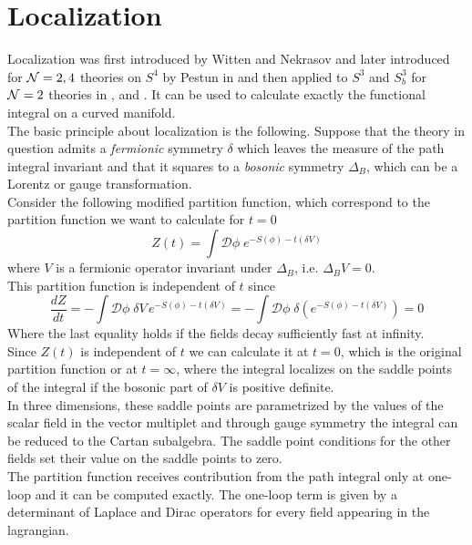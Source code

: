 \section{Localization}
Localization was first introduced by Witten \cite{Witten:1992xu} and Nekrasov \cite{Nekrasov:2002qd} and later introduced  for $\mathcal{N}=2,4$ theories on  $S^4$ by Pestun in \cite{Pestun:2007rz} and then applied to $S^3$ and $S_b^3$ for $\mathcal{N}=2$ theories in \cite{Kapustin:2009kz}, \cite{Hama:2010av} and \cite{Hama:2011ea}.
It can be used to calculate exactly the functional integral on a curved manifold.\\
The basic principle about localization is the following.
Suppose that the theory in question admits a \emph{fermionic} symmetry $\delta$ which leaves the measure of the path integral invariant and that it squares to a \emph{bosonic} symmetry $\Delta_B$, which can be a Lorentz or gauge transformation.\\
Consider the following modified partition function, which correspond to the partition function we want to calculate for $t=0$
\begin{equation}
Z(t) = \int \mathcal{D} \phi \; e^{- S(\phi) - t (\delta V)}
\end{equation}
where $V$ is a fermionic operator invariant under $\Delta_B$, i.e. $ \Delta_B V = 0$.\\
This partition function is independent of $t$ since
\begin{equation}
 \frac{d Z}{d t} = - \int \mathcal{D} \phi \; \delta V \, e^{- S(\phi) - t (\delta V)} =  - \int  \mathcal{D} \phi \; \delta \left( e^{- S(\phi) - t (\delta V)  }\right) = 0
\end{equation}
Where the last equality holds if the fields decay sufficiently fast at infinity.\\
Since $Z(t)$ is independent of $t$ we can calculate it at $t=0$, which is the original partition function or at $t=\infty$, where the integral localizes on the saddle points of the integral if the bosonic part of $\delta V$ is positive definite.\\
In three dimensions, these saddle points are parametrized by the values of the scalar field in the vector multiplet and through gauge symmetry the integral can be reduced to the Cartan subalgebra. 
The saddle point conditions for the other fields set their value on the saddle points to zero.\\
The partition function receives contribution from the path integral only at one-loop and it can be computed exactly.
The one-loop term is given by a determinant of Laplace and Dirac operators for every field appearing in the lagrangian.
